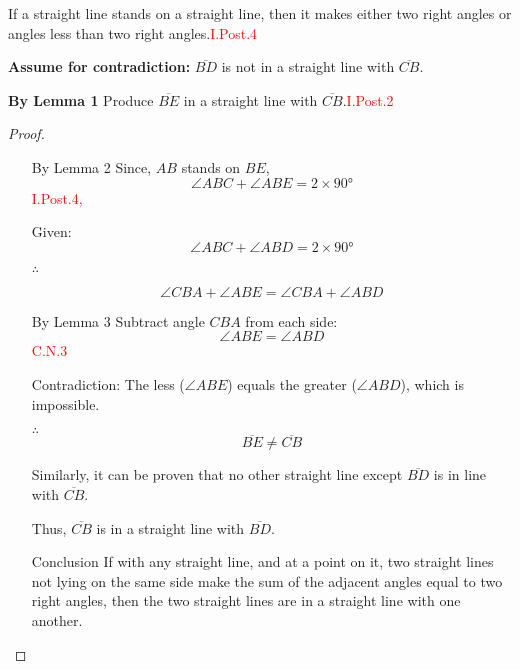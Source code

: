 \clearpage

\begin{lemma}
If a straight line stands on a straight line, then it makes either two right angles or angles less than two right angles.\hfill\textcolor{red}{I.Post.4}
\end{lemma}

\textbf{Assume for contradiction:} $\overline{BD}$ is not in a straight line with $\overline{CB}$.

\textbf{By Lemma 1} Produce $\overline{BE}$ in a straight line with $\overline{CB}$.\hfill\textcolor{red}{I.Post.2}

\begin{figure}[H]
	\caption{}
\end{figure}

\begin{proof}

\begin{itemize}

\item[]

\item[By Lemma 2] Since, $AB$ stands on $BE$, 
\[\angle{ABC} + \angle{ABE} =2\times\ang{90}\]\hfill\textcolor{red}{I.Post.4,}

\item[Given:]
\[\angle{ABC} + \angle{ABD} =2\times\ang{90}\]

\item[$\therefore$] 

\[\angle{CBA} + \angle{ABE} = \angle{CBA} + \angle{ABD}\]

\item[By Lemma 3] Subtract angle $CBA$ from each side: 
\[\angle{ABE} =  \angle{ABD}\]\hfill\textcolor{red}{C.N.3}

\item[Contradiction:] The less ($\angle{ABE}$) equals the greater ($\angle{ABD}$), which is impossible.

\item[$\therefore$]
\[ \overline{BE} \neq \overline{CB}\]

\item[Similarly,] it can be proven that no other straight line except $\overline{BD}$ is in line with $\overline{CB}$.

\item[Thus,] $\overline{CB}$ is in a straight line with $\overline{BD}$.

\item[Conclusion] If with any straight line, and at a point on it, two straight lines not lying on the same side make the sum of the adjacent angles equal to two right angles, then the two straight lines are in a straight line with one another.

\end{itemize}

\end{proof}

\clearpage
